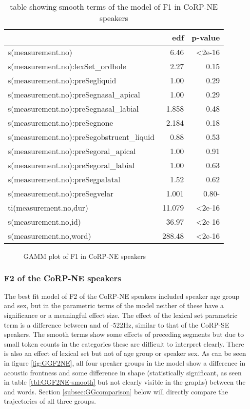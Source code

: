 \documentclass[../../../00.FullDoc/tex/Thesis]{subfiles}
\begin{document}
\begin{table}[htbp]
	\centering
	\begin{tabular}{lrr}
		\hline
		& edf & p-value \\
		\hline
		s(measurement.no) & 6.46 & <2e-16 \\
		s(measurement.no):lexSet\_ordhole & 2.27 & 0.15 \\
		s(measurement.no):preSegliquid & 1.00 & 0.29 \\
		s(measurement.no):preSegnasal\_apical & 1.00 & 0.29 \\  
		s(measurement.no):preSegnasal\_labial & 1.858 & 0.48 \\
		s(measurement.no):preSegnone & 2.184 & 0.18 \\
		s(measurement.no):preSegobstruent\_liquid & 0.88 & 0.53 \\ 
		s(measurement.no):preSegoral\_apical & 1.00 & 0.91 \\
		s(measurement.no):preSegoral\_labial & 1.00 & 0.63 \\
		s(measurement.no):preSegpalatal & 1.52 & 0.62 \\
		s(measurement.no):preSegvelar & 1.001 & 0.80- \\
		ti(measurement.no,dur) & 11.079 & <2e-16 \\
		s(measurement.no,id) & 36.97 & <2e-16 \\
		s(measurement.no,word) & 288.48 & <2e-16 \\
		\hline
	\end{tabular}
	\caption{table showing smooth terms of the model of F1 in CoRP-NE speakers}
	\label{tbl:GGF1NE-smooth}
\end{table}

\begin{figure}[h]
	
	\caption{GAMM plot of F1 in CoRP-NE speakers} \label{fig:GGF1NE}
\end{figure}

\subsubsection{F2 of the CoRP-NE speakers}
The best fit model of F2 of the CoRP-NE speakers included speaker age group and sex, but in the parametric terms of the model neither of these have a significance or a meaningful effect size. The effect of the lexical set parametric term is a difference between \hope{} and \hole{} of -522Hz, similar to that of the CoRP-SE speakers. The smooth terms show some effects of preceding segments but due to small token counts in the categories these are difficult to interpret clearly. There is also an effect of lexical set but not of age group or speaker sex. As can be seen in figure \ref{fig:GGF2NE}, all four speaker groups in the model show a difference in acoustic frontness and some difference in shape (statistically significant, as seen in table \ref{tbl:GGF2NE-smooth} but not clearly visible in the graphs) between the \hope{} and \hole{} words. Section \ref{subsec:GGcomparison} below will directly compare the trajectories of all three groups.
\end{document}
